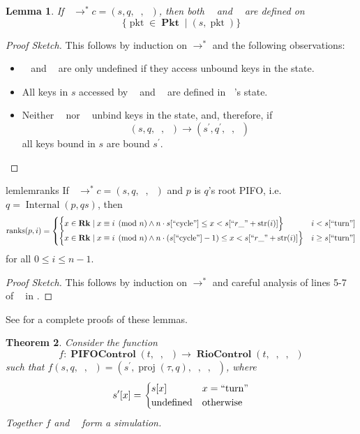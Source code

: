 \documentclass{amsart}
\DeclareMathOperator{\pkt}{\mathrm{pkt}}
\DeclareMathOperator{\proj}{\mathrm{proj}}
\DeclareMathOperator{\Pkt}{\mathbf{Pkt}}
\DeclareMathOperator{\Rk}{\mathbf{Rk}}
\DeclareMathOperator{\Internal}{\mathrm{Internal}}
\DeclareMathOperator{\PIFOControl}{\mathbf{PIFOControl}}
\DeclareMathOperator{\RioControl}{\mathbf{RioControl}}
\DeclareMathOperator{\zprepush}{z_{\mathrm{pre-push}}}
\DeclareMathOperator{\zpostpop}{z_{\mathrm{post-pop}}}
\DeclareMathOperator{\tzprepush}{z^{\prime}_{\mathrm{pre-push}}}
\DeclareMathOperator{\tzprepop}{z^{\prime}_{\mathrm{pre-pop}}}
\DeclareMathOperator{\tzpostpop}{z^{\prime}_{\mathrm{post-pop}}}
\DeclareMathOperator{\crr}{c_{\text{RR}}}
\DeclareMathOperator{\ranks}{\mathrm{ranks}}
\newtheorem{thm}{Theorem}[section]
\newtheorem{lem}[thm]{Lemma}
\theoremstyle{definition}
\begin{document}
\begin{lem}
    \label{lem:def}
    If $\crr \to^\ast c = (s, q, \zprepush, \zpostpop)$, then 
    both $\zprepush$ and $\zpostpop$ are defined on $$\{\pkt \in \Pkt \mid (s, \pkt)\}$$
\end{lem}

\begin{proof}[Proof Sketch]
    This follows by induction on $\to^\ast$ and the following observations:
    \begin{itemize}
        \item $\zprepush$ and $\zpostpop$ are only undefined if they access unbound keys in the state.
        \item All keys in $s$ accessed by $\zprepush$ and $\zpostpop$ are defined in $\crr$'s state.
        \item Neither $\zprepush$ nor $\zpostpop$ unbind keys in the state, and, therefore, if 
            $$(s, q, \zprepush, \zpostpop) \to (s^\prime, q^\prime, \zprepush, \zpostpop)$$
            all keys bound in $s$ are bound $s^\prime$. \qedhere
    \end{itemize}
\end{proof}

\begin{restatable}{lem}{lemranks}
    \label{lem:ranks}
    If $\crr \to^\ast c = (s, q, \zprepush, \zpostpop)$ and $p$ is $q$'s root PIFO, i.e. $q = \Internal(p, qs)$, then
    $$
        \ranks(p, i) =
        \begin{cases}
            \Big\{x \in \Rk \mid x \equiv i \pmod n \land n \cdot s[``\text{cycle}"] \leq x < s[``r\_" + \mathrm{str}(i)] \Big\} 
            & i < s[``\text{turn}"]\\
            \Big\{x \in \Rk \mid x \equiv i \pmod n \land n \cdot (s[``\text{cycle}"] - 1) \leq x < s[``r\_" + \mathrm{str}(i)]\Big\} 
            & i \geq s[``\text{turn}"]
        \end{cases}
    $$
    for all $0 \leq i \leq n - 1$.
\end{restatable}

\begin{proof}[Proof Sketch]
    This follows by induction on $\to^\ast$ and careful analysis of lines 5-7 of $\zpostpop$ in .
\end{proof}

See  for a complete proofs of these lemmas.

\begin{thm}
    Consider the function 
    $$f : \PIFOControl(t, \zprepush, \zpostpop) \to \RioControl(t, \tzprepush, \tzprepop, \tzpostpop)$$ 
    such that
    $f(s, q, \zprepush, \zpostpop) = (s^\prime, \proj(\tau, q), \tzprepush, \tzprepop, \tzpostpop)$, where
    $$
        s^\prime[x] = 
        \begin{cases}
            s[x] & x = ``\text{turn}"\\
            \text{undefined} & \text{otherwise}
        \end{cases}
    $$
    Together $f$ and $\crr$ form a simulation.
\end{thm}
\end{document}
